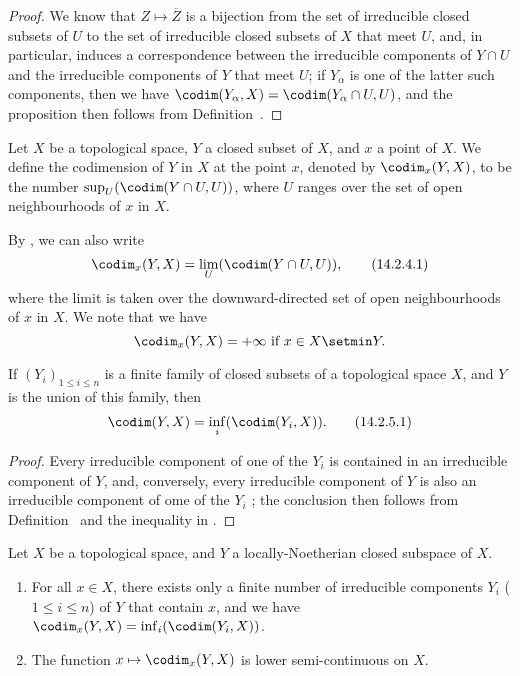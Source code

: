 \begin{proof}
\label{proof-0.14.2.3}
We know  that $Z\mapsto\overline{Z}$ is a bijection from the set of irreducible closed subsets of $U$ to the set of irreducible closed subsets of $X$ that meet $U$, and, in particular, induces a correspondence between the irreducible components of $Y\cap U$ and the irreducible components of $Y$ that meet $U$;
if $Y_\alpha$ is one of the latter such components, then we have $\codim(Y_\alpha,X)=\codim(Y_\alpha\cap U,U)$, and the proposition then follows from Definition~.
\end{proof}

\begin{defn}[14.2.4]
\label{0.14.2.4}
Let $X$ be a topological space, $Y$ a closed subset of $X$, and $x$ a point of $X$.
We define the codimension of $Y$ in $X$ at the point $x$, denoted by $\codim_x(Y,X)$, to be the number $\sup_U(\codim(Y\cap U,U))$, where $U$ ranges over the set of open neighbourhoods of $x$ in $X$.
\end{defn}

By , we can also write
\[
\label{0.14.2.4.1}
  \codim_x(Y,X)=\lim_U(\codim(Y\cap U,U)),
  \tag{14.2.4.1}
\]
where the limit is taken over the downward-directed set of open neighbourhoods of $x$ in $X$.
We note that we have
\[
  \codim_x(Y,X)=+\infty\text{ if }x\in X\setmin Y.
\]

\begin{prop}[14.2.5]
\label{0.14.2.5}
If $(Y_i)_{1\leq i\leq n}$ is a finite family of closed subsets of a topological space $X$, and $Y$ is the union of this family, then
\[
\label{0.14.2.5.1}
  \codim(Y,X)=\inf_i(\codim(Y_i,X)).
  \tag{14.2.5.1}
\]
\end{prop}

\begin{proof}
\label{proof-0.14.2.5}
Every irreducible component of one of the $Y_i$ is contained in an irreducible component of $Y$, and, conversely, every irreducible component of $Y$ is also an irreducible component of ome of the $Y_i$ ;
the conclusion then follows from Definition~ and the inequality in .
\end{proof}

\begin{cor}
\label{0.14.2.6}
Let $X$ be a topological space, and $Y$ a locally-Noetherian closed subspace of $X$.
\begin{enumerate}[label=\emph{(\roman*)}]
    \item For all $x\in X$, there exists only a finite number of irreducible components $Y_i$ ($1\leq i\leq n$) of $Y$ that contain $x$, and we have $\codim_x(Y,X)=\inf_i(\codim(Y_i,X))$.
    \item The function $x\mapsto\codim_x(Y,X)$ is lower semi-continuous on $X$.
\end{enumerate}
\end{cor}

